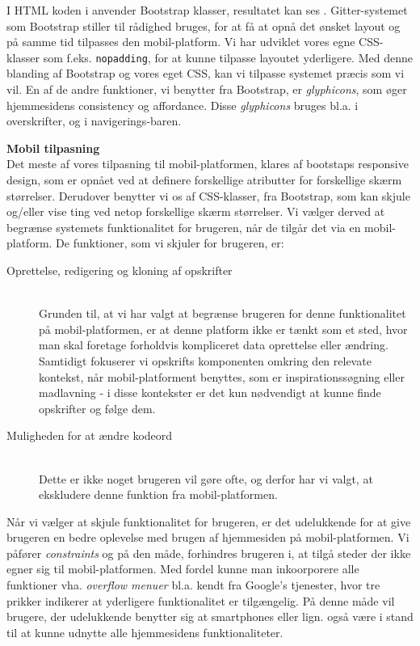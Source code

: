 I HTML koden i  anvender Bootstrap klasser, resultatet kan ses . 
Gitter-systemet som Bootstrap stiller til rådighed bruges, for at få at opnå det ønsket layout og på samme tid tilpasses den mobil-platform.
Vi har udviklet vores egne CSS-klasser som f.eks. \texttt{nopadding}, for at kunne tilpasse layoutet yderligere. 
Med denne blanding af Bootstrap og vores eget CSS, kan vi tilpasse systemet præcis som vi vil. 
En af de andre funktioner, vi benytter fra Bootstrap, er \textit{glyphicons}, som øger hjemmesidens consistency og affordance.
Disse \textit{glyphicons} bruges bl.a. i overskrifter, og i navigerings-baren.

\textbf{Mobil tilpasning}\hfill\\
Det meste af vores tilpasning til mobil-platformen, klares af bootstaps responsive design, som er opnået ved at definere forskellige atributter for forskellige skærm størrelser.
Derudover benytter vi os af CSS-klasser, fra Bootstrap, som kan skjule og/eller vise ting ved netop forskellige skærm størrelser.
Vi vælger derved at begrænse systemets funktionalitet for brugeren, når de tilgår det via en mobil-platform. De funktioner, som vi skjuler for brugeren, er:

\begin{description}
\item[Oprettelse, redigering og kloning af opskrifter]\hfill\\
Grunden til, at vi har valgt at begrænse brugeren for denne funktionalitet på mobil-platformen, er at denne platform ikke er tænkt som et sted, hvor man skal foretage forholdvis kompliceret data oprettelse eller ændring.
Samtidigt fokuserer vi opskrifts komponenten omkring den relevate kontekst, når mobil-platforment benyttes, som er inspirationssøgning eller madlavning - i disse kontekster er det kun nødvendigt at kunne finde opskrifter og følge dem.
\item[Muligheden for at ændre kodeord]\hfill\\
Dette er ikke noget brugeren vil gøre ofte, og derfor har vi valgt, at ekskludere denne funktion fra mobil-platformen.
\end{description}

Når vi vælger at skjule funktionalitet for brugeren, er det udelukkende for at give brugeren en bedre oplevelse med brugen af hjemmesiden på mobil-platformen.
Vi påfører \textit{constraints} og på den måde, forhindres brugeren i, at tilgå steder der ikke egner sig til mobil-platformen.
Med fordel kunne man inkoorporere alle funktioner vha. \textit{overflow menuer} bl.a. kendt fra Google's tjenester, hvor tre prikker indikerer at yderligere funktionalitet er tilgængelig. \cite{actionbar}
På denne måde vil brugere, der udelukkende benytter sig at smartphones eller lign. også være i stand til at kunne udnytte alle hjemmesidens funktionaliteter.

